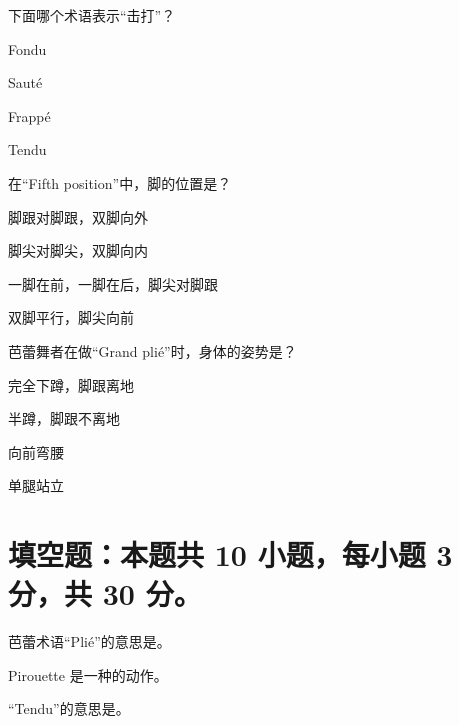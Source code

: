 \documentclass{exam-zh}
\begin{document}
    \begin{question}[points = 2]
    下面哪个术语表示“击打”？
    \begin{choices}
    \item Fondu
    \item Sauté
    \item Frappé
    \item Tendu
    \end{choices}
    \end{question}
    
    \begin{question}[points = 2]
    在“Fifth position”中，脚的位置是？
    \begin{choices}
    \item 脚跟对脚跟，双脚向外
    \item 脚尖对脚尖，双脚向内
    \item 一脚在前，一脚在后，脚尖对脚跟
    \item 双脚平行，脚尖向前
    \end{choices}
    \end{question}
    
    \begin{question}[points = 2]
    芭蕾舞者在做“Grand plié”时，身体的姿势是？
    \begin{choices}
    \item 完全下蹲，脚跟离地
    \item 半蹲，脚跟不离地
    \item 向前弯腰
    \item 单腿站立
    \end{choices}
    \end{question}






\section{填空题：本题共 10 小题，每小题 3 分，共 30 分。}


\begin{question}
    芭蕾术语“Plié”的意思是\fillin[$2$]。
    \end{question}
    
    \begin{question}
    Pirouette 是一种\fillin[$2$]的动作。
    \end{question}
    
    \begin{question}
    “Tendu”的意思是\fillin[$2$]。
    \end{question}
    
\end{document}
